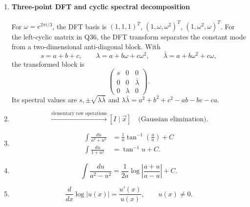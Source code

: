\begin{enumerate}[leftmargin=0pt,itemsep=6pt]
\paragraph*{Pivoted LU decomposition}
With a permutation matrix $P$, partial-pivoted LU has
\[
PA=LU,\qquad A^{-1}=U^{-1}L^{-1}P.
\]
Solve $Ly=Pe_j$ and $Ux=y$ for each column $e_j$ to compute the inverse exactly.
\label{eq:inverse-matrix}
\addtocounter{enumi}{5}
\item
\paragraph*{Three-point DFT and cyclic spectral decomposition}
For $\omega=e^{2\pi i/3}$, the DFT basis is $(1,1,1)^T$, $(1,\omega,\omega^2)^T$, $(1,\omega^2,\omega)^T$. For the left-cyclic matrix in Q36, the DFT transform separates the constant mode from a two-dimensional anti-diagonal block. With
\[
s=a+b+c,\qquad
\lambda=a+b\omega+c\omega^2,\qquad
\bar\lambda=a+b\omega^2+c\omega,
\]
the transformed block is
\[
\begin{pmatrix}s&0&0\\0&0&\bar\lambda\\0&\lambda&0\end{pmatrix}.
\]
Its spectral values are $s,\pm\sqrt{\lambda\bar\lambda}$ and
$\lambda\bar\lambda=a^2+b^2+c^2-ab-bc-ca$.
\label{eq:sum-squares}
\item
\begin{equation}
[A\mid\vec b]\xrightarrow{\text{elementary row operations}}[I\mid\vec x]
\quad\text{(Gaussian elimination)}.
\label{eq:gaussian-elimination}
\end{equation}

\item
\begin{align}
\int\frac{du}{a^2+u^2}&=\frac1a\tan^{-1}\left(\frac{u}{a}\right)+C
\label{eq:scaled-arctan-integral-38}\\
\int\frac{du}{1+u^2}&=\tan^{-1}u+C.
\label{eq:arctan-integral-38}
\end{align}

\item
\begin{equation}
\int\frac{du}{a^2-u^2}
=\frac1{2a}\log\left|\frac{a+u}{a-u}\right|+C.
\label{eq:int-rational-39}
\end{equation}

\item
\begin{equation}
\frac{d}{dx}\log|u(x)|=\frac{u'(x)}{u(x)},\qquad u(x)\ne0.
\label{eq:log-derivative-40}
\end{equation}


\end{enumerate}
